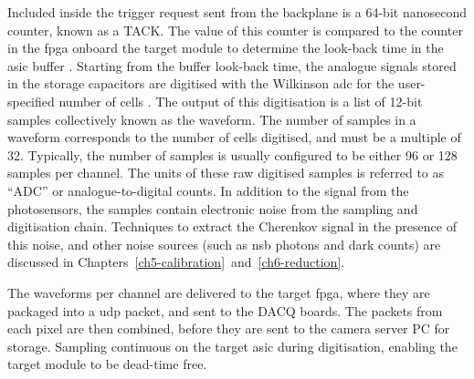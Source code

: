 Included inside the trigger request sent from the backplane is a 64-bit nanosecond counter, known as a TACK. The value of this counter is compared to the counter in the \gls{fpga} onboard the \gls{target} module to determine the look-back time in the \gls{asic} buffer \cite{Zorn2017}. Starting from the buffer look-back time, the analogue signals stored in the storage capacitors are digitised with the Wilkinson \gls{adc} for the user-specified number of cells \cite{Funk2017}. The output of this digitisation is a list of 12-bit samples collectively known as the waveform. The number of samples in a waveform corresponds to the number of cells digitised, and must be a multiple of 32. Typically, the number of samples is usually configured to be either 96 or 128 samples per channel. The units of these raw digitised samples is referred to as ``\si{ADC}'' or analogue-to-digital counts. In addition to the signal from the photosensors, the samples contain electronic noise from the sampling and digitisation chain. Techniques to extract the Cherenkov signal in the presence of this noise, and other noise sources (such as \gls{nsb} photons and dark counts) are discussed in Chapters~\ref{ch5-calibration}~and~\ref{ch6-reduction}.

The waveforms per channel are delivered to the \gls{target} \gls{fpga}, where they are packaged into a \gls{udp} packet, and sent to the DACQ boards. The packets from each pixel are then combined, before they are sent to the camera server PC for storage. Sampling continuous on the \gls{target} \gls{asic} during digitisation, enabling the \gls{target} module to be dead-time free.
